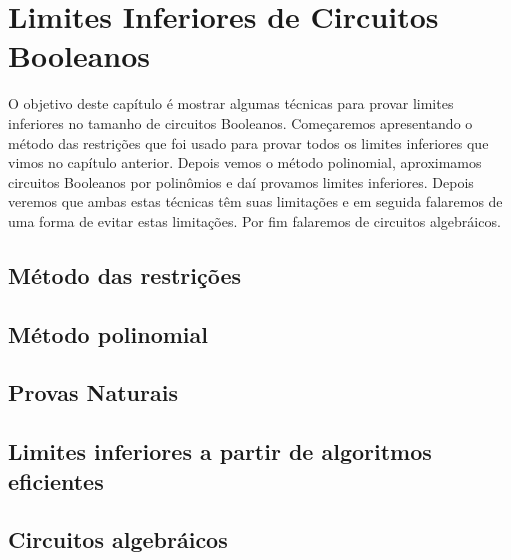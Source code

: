 \chapter{Limites Inferiores de Circuitos Booleanos}

O objetivo deste capítulo é mostrar algumas técnicas para provar limites inferiores no tamanho de circuitos Booleanos. Começaremos apresentando o método das restrições que foi usado para provar todos os limites inferiores que vimos no capítulo anterior. Depois vemos o método polinomial, aproximamos circuitos Booleanos por polinômios e daí provamos limites inferiores. Depois veremos que ambas estas técnicas têm suas limitações e em seguida falaremos de uma forma de evitar estas limitações. Por fim falaremos de circuitos algebráicos.

\section{Método das restrições}

\section{Método polinomial}

\section{Provas Naturais}

\section{Limites inferiores a partir de algoritmos eficientes}

\section{Circuitos algebráicos}